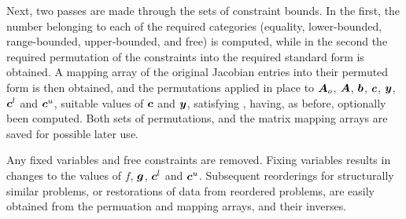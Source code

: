 \documentclass{galahad}
\begin{document}
Next, two passes are made through the sets of constraint bounds. 
In the first, the number belonging to each of the required categories 
(equality, lower-bounded, range-bounded, 
upper-bounded, and free) is computed, while in the 
second the required permutation of the constraints 
into the required standard form is obtained. 
A mapping array of the original Jacobian entries into their 
permuted form is then obtained, and the permutations applied in place 
to ${\bm{A}}_o$, ${\bm{A}}$, ${\bm{b}}$, ${\bm{c}}$, ${\bm{y}}$, ${\bm{c}}^l$ and ${\bm{c}}^u$, 
suitable values of ${\bm{c}}$ and ${\bm{y}}$, satisfying ,
having, as before, optionally been computed. 
Both sets of permutations, and the matrix mapping arrays are saved for 
possible later use. 
 
Any fixed variables and free constraints are removed. Fixing variables 
results in changes to the values of $f$, ${\bm{g}}$, ${\bm{c}}^l$ and ${\bm{c}}^u$. 
Subsequent reorderings for structurally similar problems, or restorations 
of data from reordered problems, 
are easily obtained from the permuation and mapping arrays, and their inverses. 

\end{document}
